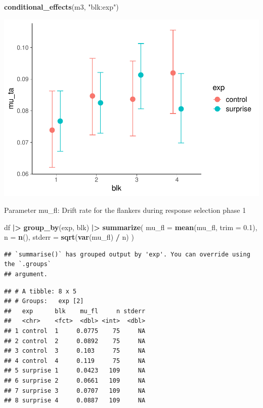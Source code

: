 \documentclass[
]{article}
\newenvironment{Shaded}{\begin{snugshade}}{\end{snugshade}}
\newcommand{\AttributeTok}[1]{\textcolor[rgb]{0.13,0.29,0.53}{#1}}
\newcommand{\FloatTok}[1]{\textcolor[rgb]{0.00,0.00,0.81}{#1}}
\newcommand{\FunctionTok}[1]{\textcolor[rgb]{0.13,0.29,0.53}{\textbf{#1}}}
\newcommand{\NormalTok}[1]{#1}
\newcommand{\SpecialCharTok}[1]{\textcolor[rgb]{0.81,0.36,0.00}{\textbf{#1}}}
\newcommand{\StringTok}[1]{\textcolor[rgb]{0.31,0.60,0.02}{#1}}
\begin{document}
\begin{Shaded}
\begin{Highlighting}[]
\FunctionTok{conditional\_effects}\NormalTok{(m3, }\StringTok{"blk:exp"}\NormalTok{)}
\end{Highlighting}
\end{Shaded}

\includegraphics{params_analyses_files/figure-latex/unnamed-chunk-4-3.pdf}

Parameter mu\_fl: Drift rate for the flankers during response selection
phase 1

\begin{Shaded}
\begin{Highlighting}[]
\NormalTok{df }\SpecialCharTok{|\textgreater{}} 
  \FunctionTok{group\_by}\NormalTok{(exp, blk) }\SpecialCharTok{|\textgreater{}} 
  \FunctionTok{summarize}\NormalTok{(}
    \AttributeTok{mu\_fl =} \FunctionTok{mean}\NormalTok{(mu\_fl, }\AttributeTok{trim =} \FloatTok{0.1}\NormalTok{),}
    \AttributeTok{n =} \FunctionTok{n}\NormalTok{(),}
    \AttributeTok{stderr =} \FunctionTok{sqrt}\NormalTok{(}\FunctionTok{var}\NormalTok{(mu\_fl) }\SpecialCharTok{/}\NormalTok{ n)}
\NormalTok{  )}
\end{Highlighting}
\end{Shaded}

\begin{verbatim}
## `summarise()` has grouped output by 'exp'. You can override using the `.groups`
## argument.
\end{verbatim}

\begin{verbatim}
## # A tibble: 8 x 5
## # Groups:   exp [2]
##   exp      blk    mu_fl     n stderr
##   <chr>    <fct>  <dbl> <int>  <dbl>
## 1 control  1     0.0775    75     NA
## 2 control  2     0.0892    75     NA
## 3 control  3     0.103     75     NA
## 4 control  4     0.119     75     NA
## 5 surprise 1     0.0423   109     NA
## 6 surprise 2     0.0661   109     NA
## 7 surprise 3     0.0707   109     NA
## 8 surprise 4     0.0887   109     NA
\end{verbatim}
\end{document}
